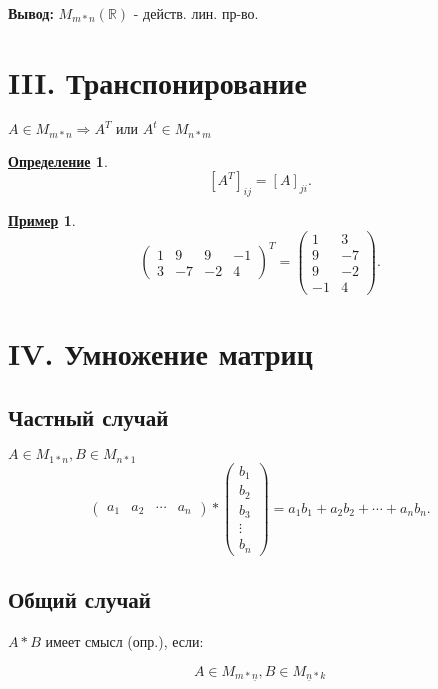 \documentclass[12pt]{article}
\newcommand{\R}{\mathbb{R}}
\newtheorem*{example}{\underline{Пример}}
\theoremstyle{definition}
\newtheorem{definition}{\underline{Определение}}[section]
\theoremstyle{definition}
\begin{document}
\textbf{Вывод:} $M_{m*n}(\R)$ - действ. лин. пр-во.

\section{III. Транспонирование}
$A \in M_{m * n} \Rightarrow A^{T} \text{ или } A^{t} \in M_{n * m}$

\begin{definition}
 \[
     [A^{T}]_{ij} = [A]_{ji}
 .\] 
\end{definition}

\begin{example}
\[
    \begin{pmatrix} 1 & 9 & 9 & -1 \\ 3 & -7 & -2 & 4 \end{pmatrix}^{T} = \begin{pmatrix} 1 & 3 \\ 9 & -7 \\ 9 & -2 \\ -1 & 4 \end{pmatrix} 
.\] 
\end{example}

\section{IV. Умножение матриц}

\subsection{Частный случай}
$A \in M_{1*n}, B \in M_{n * 1}$ 
\[
    \begin{pmatrix} a_1 & a_2 & \cdots & a_n \end{pmatrix} * \begin{pmatrix} b_1 \\ b_2 \\ b_3 \\ \vdots \\ b_n \end{pmatrix} = a_1 b_1 + a_2 b_2 + \cdots + a_n b_n
.\] 

\subsection{Общий случай}

$A * B$ имеет смысл (опр.), если:

\[
    A \in M_{m * \underline{n}}, B \in M_{\underline{n} * k}
\]
\end{document}
